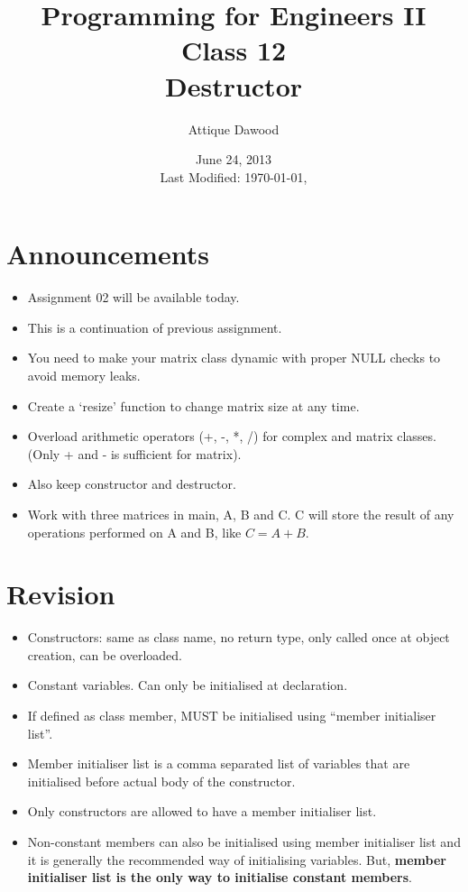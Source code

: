 \documentclass[12pt,a4paper]{article}
\title{\vspace{-2cm}Programming for Engineers II\\Class 12\\Destructor}
\author{Attique Dawood}
\date{June 24, 2013\\[0.2cm] Last Modified: \today, \currenttime}
\begin{document}
\maketitle
\section{Announcements}
\begin{itemize}
\item Assignment 02 will be available today.
\item This is a continuation of previous assignment.
\item You need to make your matrix class dynamic with proper NULL checks to avoid memory leaks.
\item Create a `resize' function to change matrix size at any time.
\item Overload arithmetic operators (+, -, *, /) for complex and matrix classes. (Only + and - is sufficient for matrix).
\item Also keep constructor and destructor.
\item Work with three matrices in main, A, B and C. C will store the result of any operations performed on A and B, like $C = A + B$.
\end{itemize}
\section{Revision}
\begin{itemize}
\item Constructors: same as class name, no return type, only called once at object creation, can be overloaded.
\item Constant variables. Can only be initialised at declaration.
\item If defined as class member, MUST be initialised using ``member initialiser list''.
\item Member initialiser list is a comma separated list of variables that are initialised before actual body of the constructor.
\item Only constructors are allowed to have a member initialiser list.
\item Non-constant members can also  be initialised using member initialiser list and it is generally the recommended way of initialising variables. But, \textbf{member initialiser list is the only way to initialise constant members}.
\end{itemize}
\end{document}
